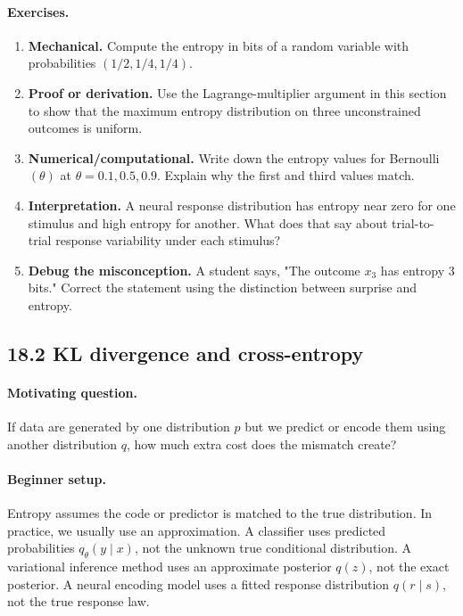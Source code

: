 \paragraph{Exercises.}
\begin{enumerate}[label=\textbf{18.1.\arabic*.}, leftmargin=*]
\item \textbf{Mechanical.} Compute the entropy in bits of a random variable with probabilities \((1/2,1/4,1/4)\).
\item \textbf{Proof or derivation.} Use the Lagrange-multiplier argument in this section to show that the maximum entropy distribution on three unconstrained outcomes is uniform.
\item \textbf{Numerical/computational.} Write down the entropy values for Bernoulli\((\theta)\) at \(\theta=0.1,0.5,0.9\). Explain why the first and third values match.
\item \textbf{Interpretation.} A neural response distribution has entropy near zero for one stimulus and high entropy for another. What does that say about trial-to-trial response variability under each stimulus?
\item \textbf{Debug the misconception.} A student says, "The outcome \(x_3\) has entropy \(3\) bits." Correct the statement using the distinction between surprise and entropy.
\end{enumerate}

\subsection{18.2 KL divergence and cross-entropy}

\paragraph{Motivating question.}
If data are generated by one distribution \(p\) but we predict or encode them using another distribution \(q\), how much extra cost does the mismatch create?

\paragraph{Beginner setup.}
Entropy assumes the code or predictor is matched to the true distribution. In practice, we usually use an approximation. A classifier uses predicted probabilities \(q_\theta(y\mid x)\), not the unknown true conditional distribution. A variational inference method uses an approximate posterior \(q(z)\), not the exact posterior. A neural encoding model uses a fitted response distribution \(q(r\mid s)\), not the true response law.

